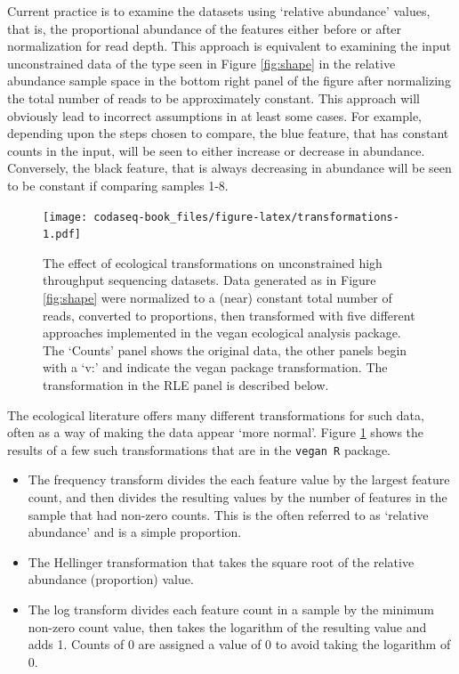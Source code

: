 \documentclass[
  onecolumn]{article}
\begin{document}
Current practice is to examine the datasets using `relative abundance' values, that is, the proportional abundance of the features either before or after normalization for read depth. This approach is equivalent to examining the input unconstrained data of the type seen in Figure \ref{fig:shape} in the relative abundance sample space in the bottom right panel of the figure after normalizing the total number of reads to be approximately constant. This approach will obviously lead to incorrect assumptions in at least some cases. For example, depending upon the steps chosen to compare, the blue feature, that has constant counts in the input, will be seen to either increase or decrease in abundance. Conversely, the black feature, that is always decreasing in abundance will be seen to be constant if comparing samples 1-8.

\begin{figure}
\centering
\texttt{[image: codaseq-book\_files/figure-latex/transformations-1.pdf]}
\caption{\label{fig:transformations}The effect of ecological transformations on unconstrained high throughput sequencing datasets. Data generated as in Figure \ref{fig:shape} were normalized to a (near) constant total number of reads, converted to proportions, then transformed with five different approaches implemented in the vegan ecological analysis package. The `Counts' panel shows the original data, the other panels begin with a `v:' and indicate the vegan package transformation. The transformation in the RLE panel is described below.}
\end{figure}

The ecological literature offers many different transformations for such data, often as a way of making the data appear `more normal'. Figure \ref{fig:transformations} shows the results of a few such transformations that are in the \texttt{vegan\ R} package.

\begin{itemize}
\item
  The frequency transform divides the each feature value by the largest feature count, and then divides the resulting values by the number of features in the sample that had non-zero counts. This is the often referred to as `relative abundance' and is a simple proportion.
\item
  The Hellinger transformation that takes the square root of the relative abundance (proportion) value.
\item
  The log transform divides each feature count in a sample by the minimum non-zero count value, then takes the logarithm of the resulting value and adds 1. Counts of 0 are assigned a value of 0 to avoid taking the logarithm of 0.
\end{itemize}
\end{document}
